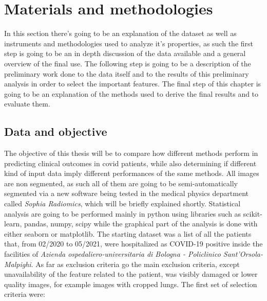 \chapter{Materials and methodologies}\label{cap: Material_method}
In this section there's going to be an explanation of the dataset as well as instruments and methodologies used to analyze it's properties, as such the first step is going to be an in depth discussion of the data available and a general overview of the final use. The following step is going to be a description of the preliminary work done to the data itself and to the results of this preliminary analysis in order to select the important features. The final step of this chapter is going to be an explanation of the methods used to derive the final results and to evaluate them.


\section{Data and objective}
\label{chap:freefree}
The objective of this thesis will be to compare how different methods perform in predicting clinical outcomes in covid patients, while also determining if different kind of input data imply different performances of the same methods.
All images are non segmented, as such all of them are going to be semi-automatically segmented via a new software being tested in the medical physics department called \textit{Sophia Radiomics}, which will be briefly explained shortly. Statistical analysis are going to be performed mainly in python using libraries such as scikit-learn, pandas, numpy, scipy while the graphical part of the analysis is done with either seaborn or matplotlib.
The starting dataset was a list of all the patients that, from 02/2020 to 05/2021, were hospitalized as COVID-19 positive inside the facilities of \textit{Azienda ospedaliero-universitaria di Bologna - Policlinico Sant'Orsola-Malpighi}. As far as exclusion criteria go the main exclusion criteria, except unavailability of the feature related to the patient, was visibly damaged or lower quality images, for example images with cropped lungs. The first set of selection criteria were:

